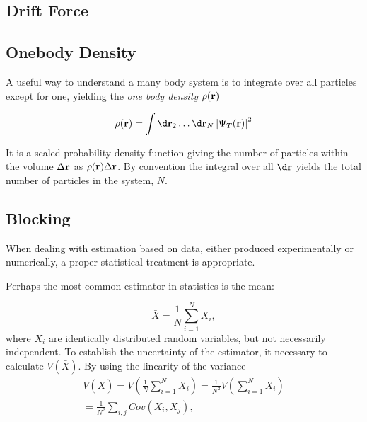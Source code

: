 \subsection{Drift Force}
\subsection{Onebody Density}

A useful way to understand a many body system is to integrate over all
particles except for one, yielding the \textit{one body density} \(\rho(\vb{r})\)

\begin{align*}
  \rho(\vb{r}) = \int \d \vb{r}_{2}\ldots\d\vb{r}_{N}\left| \psit \right|^{2}
\end{align*}

It is a scaled probability density function giving the number of particles
within the volume \(\Delta \vb{r}\) as \(\rho(\vb{r})\Delta \vb{r}\).
By convention the integral over all \(\d \vb{r}\) yields the total number of
particles in the system, \(N\).

\subsection{Blocking}
\label{sec:blocking}
When dealing with estimation based on data, either produced experimentally or numerically, a proper statistical treatment is appropriate. 

Perhaps the most common estimator in statistics is the mean:

\begin{equation}
	\label{eq:mean}
	\bar{X} = \frac{1}{N}\sum_{i=1}^{N}{X_i},
\end{equation}
where $X_i$ are identically distributed random variables, but not necessarily independent. To establish the uncertainty of the estimator, it necessary to calculate $V(\bar{X})$. By using the linearity of the variance
\begin{equation}
\label{eq:estimator var}
\begin{split}
	V(\bar{X}) = V(\frac{1}{N}\sum_{i=1}^{N}{X_i}) = \frac{1}{N^2}V(\sum_{i=1}^{N}{X_i})\\
	=\frac{1}{N^2}\sum_{i,j}{Cov(X_i, X_j)},
\end{split}
\end{equation}

